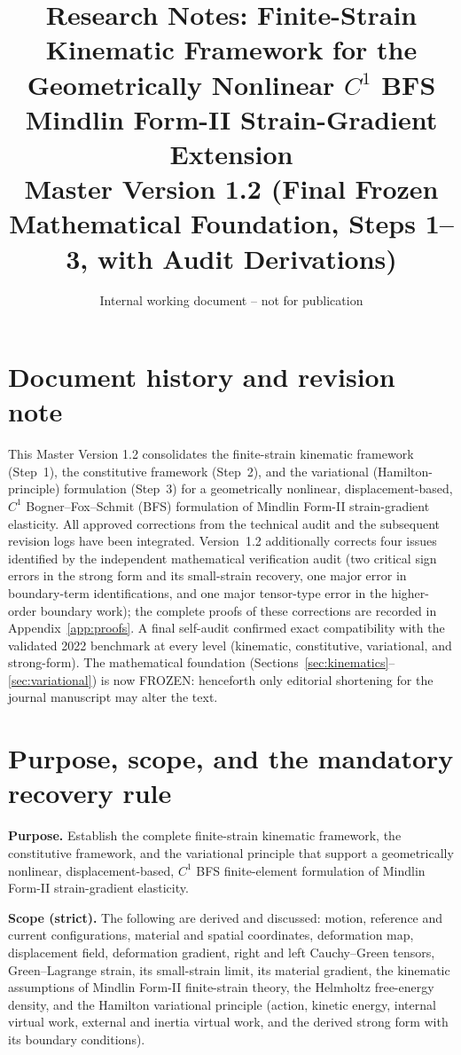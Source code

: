 \documentclass[11pt]{article}
\title{Research Notes: Finite-Strain Kinematic Framework for the
Geometrically Nonlinear $C^{1}$ BFS Mindlin Form-II Strain-Gradient
Extension \\
\large Master Version 1.2 (Final Frozen Mathematical Foundation, Steps 1--3, with Audit Derivations)}
\author{Internal working document -- not for publication}
\date{}
\begin{document}
\maketitle

\tableofcontents

\section{Document history and revision note}

This Master Version 1.2 consolidates the finite-strain kinematic
framework (Step~1), the constitutive framework (Step~2), and the
variational (Hamilton-principle) formulation (Step~3) for a
geometrically nonlinear, displacement-based, $C^{1}$ Bogner--Fox--Schmit
(BFS) formulation of Mindlin Form-II strain-gradient elasticity. All
approved corrections from the technical audit and the subsequent
revision logs have been integrated. Version~1.2 additionally corrects
four issues identified by the independent mathematical verification
audit (two critical sign errors in the strong form and its small-strain
recovery, one major error in boundary-term identifications, and one
major tensor-type error in the higher-order boundary work); the
complete proofs of these corrections are recorded in
Appendix~\ref{app:proofs}. A final self-audit confirmed exact
compatibility with the validated 2022 benchmark at every level
(kinematic, constitutive, variational, and strong-form). The
mathematical foundation (Sections~\ref{sec:kinematics}--\ref{sec:variational}) is now FROZEN: henceforth only editorial
shortening for the journal manuscript may alter the text.

\section{Purpose, scope, and the mandatory recovery rule}

\textbf{Purpose.} Establish the complete finite-strain kinematic
framework, the constitutive framework, and the variational principle
that support a geometrically nonlinear, displacement-based, $C^{1}$ BFS
finite-element formulation of Mindlin Form-II strain-gradient elasticity.

\textbf{Scope (strict).} The following are derived and discussed: motion,
reference and current configurations, material and spatial coordinates,
deformation map, displacement field, deformation gradient, right and
left Cauchy--Green tensors, Green--Lagrange strain, its small-strain
limit, its material gradient, the kinematic assumptions of Mindlin
Form-II finite-strain theory, the Helmholtz free-energy density, and the
Hamilton variational principle (action, kinetic energy, internal virtual
work, external and inertia virtual work, and the derived
strong form with its boundary conditions).
\end{document}
